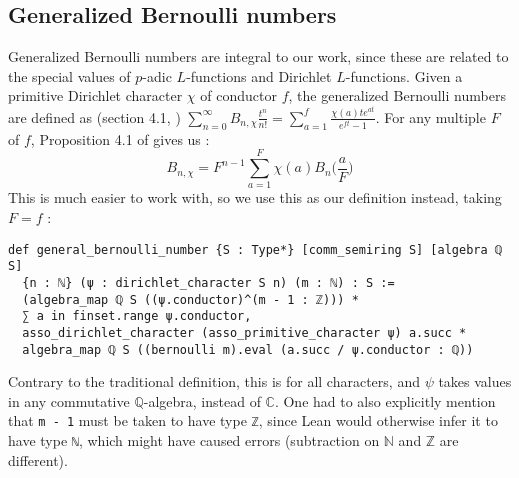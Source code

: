 \documentclass[a4paper,UKenglish,cleveref, autoref, thm-restate,pdfa]{lipics-v2021}
\newcommand{\lean}[1]{\texttt{#1}\xspace} %
\begin{document}
\subsection{Generalized Bernoulli numbers}
Generalized Bernoulli numbers are integral to our work, since these are related to the special values of $p$-adic $L$-functions and Dirichlet $L$-functions. 
Given a primitive Dirichlet character $\chi$ of conductor $f$, the generalized Bernoulli numbers are defined as (section 4.1, \cite{cyc}) 
$ \sum_{n = 0}^{\infty} B_{n,\chi} \frac{t^n}{n!} = \sum_{a = 1}^f \frac{\chi(a)t e^{at}}{e^{ft} - 1} $. 
For any multiple $F$ of $f$, Proposition 4.1 of \cite{cyc} gives us : 
$$ B_{n, \chi} = F^{n - 1} \sum_{a = 1}^{F} \chi (a) B_n \bigg( \frac{a}{F} \bigg) $$
This is much easier to work with, so we use this as our definition instead, taking $F = f$ :
\begin{lstlisting}
def general_bernoulli_number {S : Type*} [comm_semiring S] [algebra ℚ S] 
  {n : ℕ} (ψ : dirichlet_character S n) (m : ℕ) : S :=
  (algebra_map ℚ S ((ψ.conductor)^(m - 1 : ℤ))) * 
  ∑ a in finset.range ψ.conductor,
  asso_dirichlet_character (asso_primitive_character ψ) a.succ * 
  algebra_map ℚ S ((bernoulli m).eval (a.succ / ψ.conductor : ℚ))
\end{lstlisting}
Contrary to the traditional definition, this is for all characters, and $\psi$ takes values 
in any commutative $\mathbb{Q}$-algebra, instead of $\mathbb{C}$. One had to also explicitly mention that \lean{m - 1} must be taken to have type \lean{ℤ}, since Lean would otherwise infer 
it to have type \lean{ℕ}, which might have caused errors (subtraction on $\mathbb{N}$ 
and $\mathbb{Z}$ are different).

\end{document}
